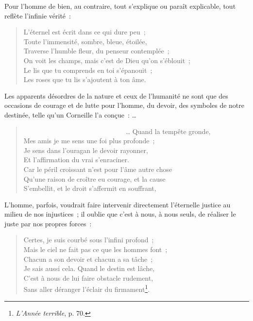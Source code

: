 \documentclass[french,twoside]{book} %
\newenvironment{quoteblock}%
  {\begin{quoting}}
  {\end{quoting}}
\newenvironment{quotebar}{%
    \def\FrameCommand{{\color{rubric!10!}\vrule width 0.5em} \hspace{0.9em}}%
    \def\OuterFrameSep{\itemsep} %
    \MakeFramed {\advance\hsize-\width \FrameRestore}
  }%
  {%
    \endMakeFramed
  }
\renewenvironment{quoteblock}%
  {%
    \savenotes
    \setstretch{0.9}
    \normalfont
    \begin{quotebar}
  }
  {%
    \end{quotebar}
    \spewnotes
  }
\begin{document}
\noindent Pour l’homme de bien, au contraire, tout s’explique ou paraît explicable, tout reflète l’infinie vérité :\par


\begin{verse}
L’éternel est écrit dans ce qui dure peu ;\\
Toute l’immensité, sombre, bleue, étoilée,\\
Traverse l’humble fleur, du penseur contemplée ;\\
On voit les champs, mais c’est de Dieu qu’on s’éblouit ;\\
Le lis que tu comprends en toi s’épanouit ;\\
Les roses que tu lis s’ajoutent à ton âme.\\
\end{verse}

\noindent Les apparents désordres de la nature et ceux de l’humanité ne sont que des occasions de courage et de lutte pour l’homme, du devoir, des symboles de notre destinée, telle qu’un Corneille l’a conçue : …\par


\begin{verse}
                              … Quand la tempête gronde,\\
Mes amis je me sens une foi plus profonde ;\\
Je sens dans l’ouragan le devoir rayonner,\\
Et l’affirmation du vrai s’enraciner.\\
Car le péril croissant n’est pour l’âme autre chose\\
Qu’une raison de croître eu courage, et la cause\\
S’embellit, et le droit s’affermit en souffrant,\\
\end{verse}
\begin{quoteblock}
\end{quoteblock}

\noindent L’homme, parfois, voudrait faire intervenir directement l’éternelle justice au milieu de nos injustices ; il oublie que c’est à nous, à nous seuls, de réaliser le juste par nos propres forces :\par


\begin{verse}
Certes, je suis courbé sous l’infini profond ;\\
Mais le ciel ne fait pas ce que les hommes font ;\\
Chacun a son devoir et chacun a sa tâche ;\\
Je sais aussi cela. Quand le destin est lâche,\\
C’est à nous de lui faire obstacle rudement,\\
Sans aller déranger l’éclair du firmament\footnote{\emph{L’Année terrible}, p. 70.}.\\
\end{verse}
\end{document}
